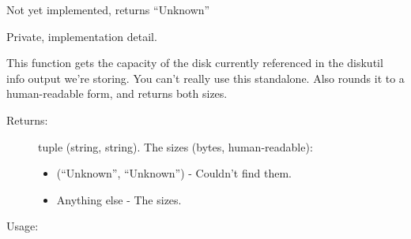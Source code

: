 \documentclass[letterpaper,10pt,english]{sphinxmanual}
\begin{document}

\begin{fulllineitems}
\label{\detokenize{macos:getdevinfo.macos.get_capabilities}}
Not yet implemented, returns “Unknown”

\end{fulllineitems}


\begin{fulllineitems}
\label{\detokenize{macos:getdevinfo.macos.get_capacity}}
Private, implementation detail.

This function gets the capacity of the disk currently referenced in
the diskutil info output we’re storing. You can’t really use this standalone.
Also rounds it to a human-readable form, and returns both sizes.
\begin{description}
\item[{Returns:}] \leavevmode
tuple (string, string). The sizes (bytes, human-readable):
\begin{itemize}
\item {} 
(“Unknown”, “Unknown”)     - Couldn’t find them.

\item {} 
Anything else              - The sizes.

\end{itemize}

\end{description}

Usage:

\begin{sphinxVerbatim}[commandchars=\\\{\}]
   
\end{sphinxVerbatim}

\end{fulllineitems}

\end{document}
